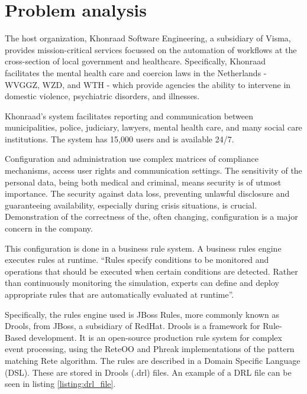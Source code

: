 \section{Problem analysis}

The host organization, Khonraad Software Engineering, a subsidiary of Visma, provides mission-critical services focussed on the automation of workflows at the cross-section of local government and healthcare.
Specifically, Khonraad facilitates the mental health care and coercion laws in the Netherlands - WVGGZ, WZD, and WTH - which provide agencies the ability to intervene in domestic violence, psychiatric disorders, and illnesses.

Khonraad's system facilitates reporting and communication between municipalities, police, judiciary, lawyers, mental health care, and many social care institutions.
The system has 15,000 users and is available 24/7. 

Configuration and administration use complex matrices of compliance mechanisms, access user rights and communication settings.
The sensitivity of the personal data, being both medical and criminal, means security is of utmost importance.
The security against data loss, preventing unlawful disclosure and guaranteeing availability, especially during crisis situations, is crucial.
Demonstration of the correctness of the, often changing, configuration is a major concern in the company. 

This configuration is done in a business rule system. 
A business rules engine executes rules at runtime. 
``Rules specify conditions to be monitored and operations that should be executed when certain conditions are detected.
Rather than continuously monitoring the simulation, experts can define and deploy appropriate rules that are automatically evaluated at runtime''\cite{liu2003dios++}. 

Specifically, the rules engine used is JBoss Rules, more commonly known as Drools, from JBoss, a subsidiary of RedHat\cite{browne2009jboss}.
Drools is a framework for Rule-Based development.
It is an open-source production rule system for complex event processing, using the ReteOO and Phreak implementations of the pattern matching Rete algorithm\cite{forgy1989rete}.
The rules are described in a Domain Specific Language (DSL).
These are stored in Drools (.drl) files. 
An example of a DRL file can be seen in listing \ref{listing:drl_file}. 

